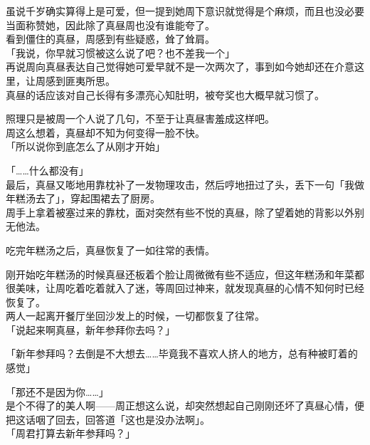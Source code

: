 虽说千岁确实算得上是可爱，但一提到她周下意识就觉得是个麻烦，而且也没必要当面称赞她，因此除了真昼周也没有谁能夸了。\\

看到僵住的真昼，周感到有些疑惑，耸了耸肩。\\

「我说，你早就习惯被这么说了吧？也不差我一个」\\

再说周向真昼表达自己觉得她可爱早就不是一次两次了，事到如今她却还在介意这里，让周感到匪夷所思。\\

真昼的话应该对自己长得有多漂亮心知肚明，被夸奖也大概早就习惯了。

照理只是被周一个人说了几句，不至于让真昼害羞成这样吧。\\

周这么想着，真昼却不知为何变得一脸不快。\\

「所以说你到底怎么了从刚才开始」

「……什么都没有」\\

最后，真昼又嘭地用靠枕补了一发物理攻击，然后哼地扭过了头，丢下一句「我做年糕汤去了」，穿起围裙去了厨房。\\

周手上拿着被塞过来的靠枕，面对突然有些不悦的真昼，除了望着她的背影以外别无他法。\\

\vspace{2\baselineskip}

吃完年糕汤之后，真昼恢复了一如往常的表情。

刚开始吃年糕汤的时候真昼还板着个脸让周微微有些不适应，但这年糕汤和年菜都很美味，让周吃着吃着就入了迷，等周回过神来，就发现真昼的心情不知何时已经恢复了。\\

两人一起离开餐厅坐回沙发上的时候，一切都恢复了往常。\\

「说起来啊真昼，新年参拜你去吗？」

「新年参拜吗？去倒是不大想去……毕竟我不喜欢人挤人的地方，总有种被盯着的感觉」

「那还不是因为你……」\\

是个不得了的美人啊——周正想这么说，却突然想起自己刚刚还坏了真昼心情，便把这话咽了回去，回答道「这也是没办法啊」。\\

「周君打算去新年参拜吗？」

